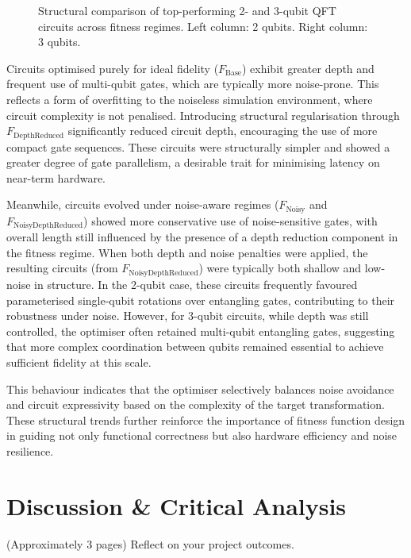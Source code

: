 \documentclass[11pt,a4paper]{article}
\begin{document}
\begin{figure}[H]
    \caption{Structural comparison of top-performing 2- and 3-qubit QFT circuits across fitness regimes. Left column: 2 qubits. Right column: 3 qubits.}
    \label{fig:structural_comparison_all}
\end{figure}

Circuits optimised purely for ideal fidelity ($F_{\mathrm{Base}}$) exhibit greater depth and frequent use of multi-qubit gates, which are typically more noise-prone. This reflects a form of overfitting to the noiseless simulation environment, where circuit complexity is not penalised. Introducing structural regularisation through $F_{\mathrm{DepthReduced}}$ significantly reduced circuit depth, encouraging the use of more compact gate sequences. These circuits were structurally simpler and showed a greater degree of gate parallelism, a desirable trait for minimising latency on near-term hardware.\newline

Meanwhile, circuits evolved under noise-aware regimes ($F_{\mathrm{Noisy}}$ and $F_{\mathrm{NoisyDepthReduced}}$) showed more conservative use of noise-sensitive gates, with overall length still influenced by the presence of a depth reduction component in the fitness regime. When both depth and noise penalties were applied, the resulting circuits (from $F_{\mathrm{NoisyDepthReduced}}$) were typically both shallow and low-noise in structure. In the 2-qubit case, these circuits frequently favoured parameterised single-qubit rotations over entangling gates, contributing to their robustness under noise. However, for 3-qubit circuits, while depth was still controlled, the optimiser often retained multi-qubit entangling gates, suggesting that more complex coordination between qubits remained essential to achieve sufficient fidelity at this scale.\newline

This behaviour indicates that the optimiser selectively balances noise avoidance and circuit expressivity based on the complexity of the target transformation. These structural trends further reinforce the importance of fitness function design in guiding not only functional correctness but also hardware efficiency and noise resilience.

%
%
\section{Discussion \& Critical Analysis}\label{sec:analysis}
(Approximately 3 pages) Reflect on your project outcomes.
\end{document}
